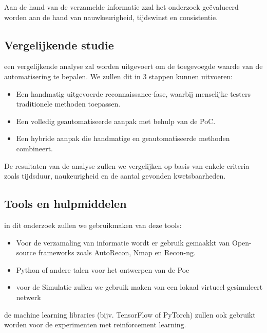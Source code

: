 Aan de hand van de verzamelde informatie zzal het onderzoek geëvalueerd worden aan de hand van nauwkeurigheid, tijdswinst en consistentie.

\subsection{Vergelijkende studie}

een vergelijkende analyse zal worden uitgevoert om de toegevoegde waarde van de automatisering te bepalen. We zullen dit in 3
stappen kunnen uitvoeren:

\begin{itemize}
    \item Een handmatig uitgevoerde reconnaissance-fase, waarbij menselijke testers traditionele methoden toepassen.
    \item Een volledig geautomatiseerde aanpak met behulp van de PoC.
    \item Een hybride aanpak die handmatige en geautomatiseerde methoden combineert.
\end{itemize}

De resultaten van de analyse zullen we vergelijken op basis van enkele criteria zoals tijdsduur, naukeurigheid en de aantal gevonden kwetsbaarheden.

\subsection{Tools en hulpmiddelen}

in dit onderzoek zullen we gebruikmaken van deze tools: 

\begin{itemize}
    \item Voor de verzamaling van informatie wordt er gebruik gemaakkt van Open-source frameworks zoals AutoRecon, Nmap en Recon-ng.
    \item Python of andere talen voor het ontwerpen van de Poc
    \item voor de Simulatie zullen we gebruik maken van een lokaal virtueel gesimuleert netwerk
\end{itemize}

de machine learning libraries (bijv. TensorFlow of PyTorch) zullen ook gebruikt worden voor de experimenten met reinforcement learning.


